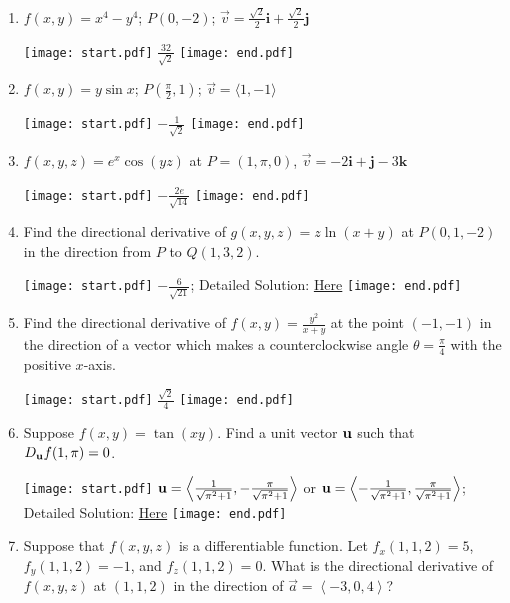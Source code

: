 \documentclass[12pt]{article}
\begin{document}
\begin{enumerate}

\item $f(x,y)=x^4-y^4$; $P(0,-2)$; $\overrightarrow{v}=\frac{\sqrt{2}}{2}\mathbf{i}+\frac{\sqrt{2}}{2}\mathbf{j}$ 

\texttt{[image: start.pdf]}
{{$\frac{32}{\sqrt{2}}$}}
\texttt{[image: end.pdf]}


\item $f(x,y)=y\sin{x}$; $P\left(\frac{\pi}{2},1\right)$; $\overrightarrow{v}=\langle 1,-1 \rangle$ 

\texttt{[image: start.pdf]}
{{$-\frac{1}{\sqrt{2}}$}}
\texttt{[image: end.pdf]}


\item $f(x,y,z)=e^{x}\cos{(yz)}$ at $P=(1, \pi, 0)$, $\overrightarrow{v}=-2\mathbf{i}+\mathbf{j}-3\mathbf{k}$ 

\texttt{[image: start.pdf]}
{{$-\frac{2e}{\sqrt{14}}$}}
\texttt{[image: end.pdf]}


\item Find the directional derivative of $g(x,y,z)=z\ln{(x+y)}$ at $P(0,1,-2)$ in the direction from $P$ to $Q(1,3, 2)$.

\texttt{[image: start.pdf]}
{{$-\frac{6}{\sqrt{21}}$; Detailed Solution: \textcolor{blue}{\href{http://www.math.drexel.edu/classes/Calculus/resources/Math200HW/Solutions/12_200_Gradient_04.pdf}{Here}} }}
\texttt{[image: end.pdf]}


\item Find the directional derivative of $f(x,y)=\frac{y^2}{x+y}$ at the point $(-1,-1)$ in the direction of a vector which makes a counterclockwise angle $\theta=\frac{\pi}{4}$ with the positive $x$-axis.

\texttt{[image: start.pdf]}
{{$\frac{\sqrt{2}}{4}$}}
\texttt{[image: end.pdf]}


\item Suppose $f(x,y)=\tan{(xy)}$.  Find a unit vector ${\bf u}$ such that $D_{\bf u}f(1,\pi)=0$.

\texttt{[image: start.pdf]}
{{${\bf u}=\left\langle\frac{1}{\sqrt{\pi^2+1}},-\frac{\pi}{\sqrt{\pi^2+1}}\right\rangle$ or ${\bf u}=\left\langle-\frac{1}{\sqrt{\pi^2+1}},\frac{\pi}{\sqrt{\pi^2+1}}\right\rangle$;  Detailed Solution: \textcolor{blue}{\href{http://www.math.drexel.edu/classes/Calculus/resources/Math200HW/Solutions/12_200_Gradient_06.pdf}{Here}}}}
\texttt{[image: end.pdf]}


\item Suppose that $\displaystyle f(x,y,z)$ is a differentiable function.  Let $\displaystyle f_{x}(1,1,2)=5$, $\displaystyle f_{y}(1,1,2)=-1$, and $\displaystyle f_{z}(1,1,2)=0$.  What is the directional derivative of $\displaystyle f(x,y,z)$ at $(1,1,2)$ in the direction of $\displaystyle \overrightarrow{a}=\left \langle -3, 0, 4 \right \rangle$?


\end{enumerate}
\end{document}
